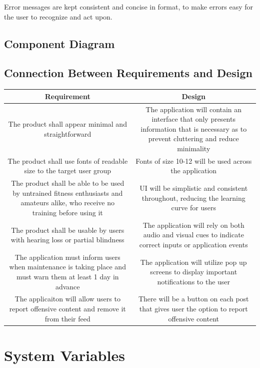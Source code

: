 \documentclass[12pt, titlepage]{article}
\begin{document}
	Error messages are kept consistent and concise in format, to make errors easy for the user to recognize and act upon.
  
	\subsection{Component Diagram}
	
	\subsection{Connection Between Requirements and Design} \label{SecConnection}
	
	\begin{tabular}{|c|c|}
		\hline
		Requirement & Design \\
		\hline
		The product shall appear minimal and straightforward & The application will contain an interface that only presents information that is necessary as to prevent cluttering and reduce minimality \\
		\hline
		The product shall use fonts of readable size to the target user group & Fonts of size 10-12 will be used across the application \\
		\hline
		The product shall be able to be used by untrained fitness enthusiasts and amateurs alike, who receive no training before using it & UI will be simplistic and consistent throughout, reducing the learning curve for users \\
		\hline
		The product shall be usable by users with hearing loss or partial blindness & The application will rely on both audio and visual cues to indicate correct inputs or application events \\
		\hline
		The application must inform users when maintenance is taking place and must warn them at least 1 day in advance & The application will utilize pop up screens to display important notifications to the user \\
		\hline
		The applicaiton will allow users to report offensive content and remove it from their feed & There will be a button on each post that gives user the option to report offensive content \\
		\hline

	\end{tabular}
	
	\section{System Variables}
	
\end{document}
